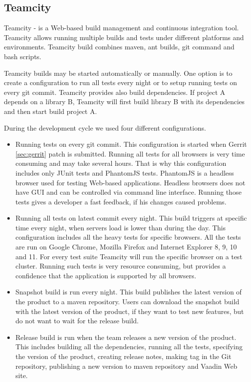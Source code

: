   \subsection{Teamcity}
  Teamcity - is a Web-based build management and continuous integration tool.
  Teamcity allows running multiple builds and tests under different platforms and environments.
  Teamcity build combines maven, ant builds, git command and bash scripts.
  
  Teamcity builds may be started automatically or manually. One option is to create a configuration 
  to run all  tests every night or to setup running tests on every git commit. Teamcity
  provides also build dependencies. If project A depends on a library B,
  Teamcity will first build library B with its dependencies and then start build
  project A.
  
  During the development cycle we used four different configurations.
  \begin{itemize}
  \item Running tests on every git commit. This configuration is started when
  Gerrit \ref{sec:gerrit} patch is submitted.
   Running all tests for all browsers is very time consuming and may take several hours. 
   That is why this configuration includes only JUnit tests and PhantomJS
   \cite{phanotmSite} tests. PhantomJS is a headless browser used for testing Web-based applications.
   Headless browsers does not have GUI and can be controlled via command line
   interface. Running those tests gives a developer a fast feedback, if his changes caused problems.
   
   \item Running all tests on latest commit every night. This build triggers at
    specific time every night, when servers load is lower than during the day.
    This configuration includes all the heavy tests for specific browsers. All
    the tests are run on Google Chrome, Mozilla Firefox and Internet Explorer 8, 9, 10 and 11. 
    For every test suite Teamcity will run the specific browser on a test
    cluster. Running such tests is very resource consuming, but provides a
    confidence that the application is supported by all browsers.
    
    \item Snapshot build is run every night. This build publishes the latest
    version of the product to a maven repository.  Users can download
    the snapshot build with the latest version of the product, if they want to
    test new features, but do not want to wait for the release build.
    
    \item Release build is run when the team releases a new version of the
    product. This includes building all the dependencies, running all the tests,
    specifying the version of the product, creating release notes, making tag in
    the Git repository, publishing a new version to maven repository and Vaadin
    Web site.
   \end{itemize}

